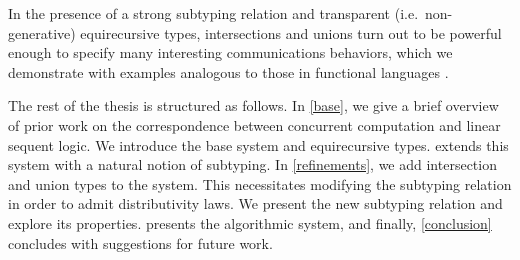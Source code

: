 In the presence of a strong subtyping relation and transparent (i.e.\ non-generative)  equirecursive types, intersections and unions turn out to be powerful enough to specify many interesting communications behaviors, which we demonstrate with examples analogous to those in functional languages \cite{FreemanP91,Dunfield03}.

The rest of the thesis is structured as follows. In \cref{base}, we give a brief overview of prior work on the correspondence between concurrent computation and linear sequent logic. We introduce the base system and equirecursive types.  extends this system with a natural notion of subtyping. In \cref{refinements}, we add intersection and union types to the system. This necessitates modifying the subtyping relation in order to admit distributivity laws. We present the new subtyping relation and explore its properties.  presents the algorithmic system, and finally, \cref{conclusion} concludes with suggestions for future work.


